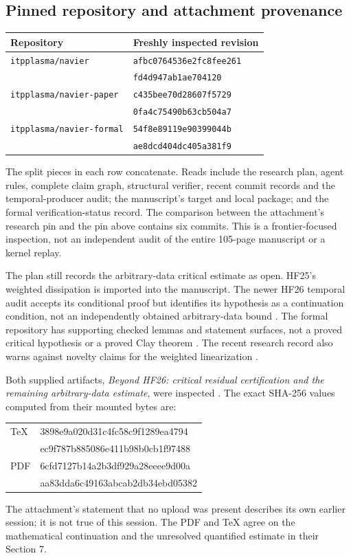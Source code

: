 \documentclass[11pt,a4paper]{article}
\theoremstyle{definition}\newtheorem{definition}[theorem]{Definition}
\theoremstyle{remark}\newtheorem{remark}[theorem]{Remark}
\numberwithin{equation}{section}
\begin{document}
\subsection{Pinned repository and attachment provenance}
\begin{center}\small
\begin{tabular}{@{}lp{102mm}@{}}\toprule
Repository & Freshly inspected revision\\\midrule
\texttt{itpplasma/navier} & \texttt{afbc0764536e2fc8fee261}\\[-2pt]
 & \texttt{fd4d947ab1ae704120}\\
\texttt{itpplasma/navier-paper} & \texttt{c435bee70d28607f5729}\\[-2pt]
 & \texttt{0fa4c75490b63cb504a7}\\
\texttt{itpplasma/navier-formal} & \texttt{54f8e89119e90399044b}\\[-2pt]
 & \texttt{ae8dcd404dc405a381f9}\\\bottomrule
\end{tabular}
\end{center}
The split pieces in each row concatenate. Reads include the research plan, agent rules, complete claim graph, structural verifier, recent commit records and the temporal-producer audit; the manuscript's target and local package; and the formal verification-status record. The comparison between the attachment's research pin and the pin above contains six commits. This is a frontier-focused inspection, not an independent audit of the entire 105-page manuscript or a kernel replay.

The plan still records the arbitrary-data critical estimate as open. HF25's weighted dissipation is imported into the manuscript. The newer HF26 temporal audit accepts its conditional proof but identifies its hypothesis as a continuation condition, not an independently obtained arbitrary-data bound \cite{Research,TemporalAudit}. The formal repository has supporting checked lemmas and statement surfaces, not a proved critical hypothesis or a proved Clay theorem \cite{Formal}. The recent research record also warns against novelty claims for the weighted linearization \cite{ResearchCommit}.

Both supplied artifacts, \emph{Beyond HF26: critical residual certification and the remaining arbitrary-data estimate}, were inspected \cite{Attachment}. The exact SHA-256 values computed from their mounted bytes are:
\begin{center}\footnotesize\ttfamily
\begin{tabular}{@{}ll@{}}
TeX & 3898e9a020d31c4fc58c9f1289ea4794\\[-2pt]
    & ec9f787b885086e411b98b0cb1f97488\\[3pt]
PDF & 6cfd7127b14a2b3df929a28eeee9d00a\\[-2pt]
    & aa83dda6c49163abcab2db34ebd05382
\end{tabular}
\end{center}
The attachment's statement that no upload was present describes its own earlier session; it is not true of this session. The PDF and TeX agree on the mathematical continuation and the unresolved quantified estimate in their Section 7.
\end{document}
